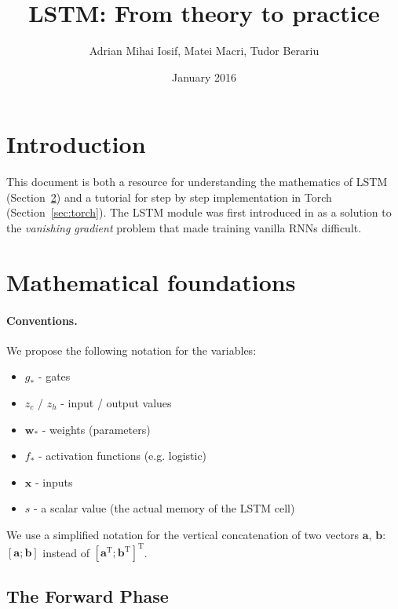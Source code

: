 \documentclass[11pt]{article}
\title{LSTM: From theory to practice}
\author{Adrian Mihai Iosif, Matei Macri, Tudor Berariu}
\date{January 2016}
\begin{document}
\maketitle

\section{Introduction}

This document is both a resource for understanding the mathematics of LSTM (Section~\ref{sec:math}) and a tutorial for step by step implementation in Torch (Section~\ref{sec:torch}).
The LSTM module was first introduced in \cite{hochreiter1997long} as a solution to the \emph{vanishing gradient} problem that made training vanilla RNNs difficult.

\section{Mathematical foundations}
\label{sec:math}

\paragraph{Conventions.} We propose the following notation for the variables:
\begin{itemize}
    \item $g_{*}$ - gates
    \item $z_{c}$ / $z_h$ - input / output values
    \item $\mathbf{w}_{*}$ - weights (parameters)
    \item $f_{*}$ - activation functions (e.g. logistic)
    \item $\mathbf{x}$ - inputs
    \item $s$ - a scalar value (the actual memory of the LSTM cell)
\end{itemize}

We use a simplified notation for the vertical concatenation of two vectors $\mathbf{a}$, $\mathbf{b}$: $\left[\mathbf{a}; \mathbf{b}\right]$ instead of $\left[ \mathbf{a}^{\text{T}} ; \mathbf{b}^{\text{T}} \right]^{\text{T}}$.

\begin{center}

\end{center}

\subsection{The Forward Phase}
\end{document}
